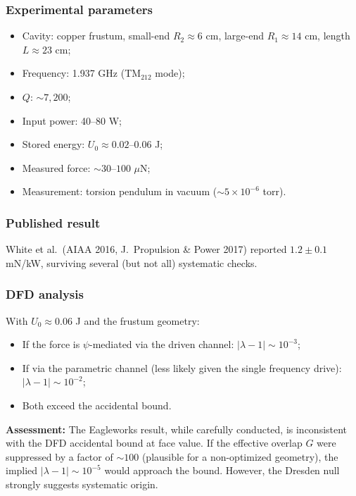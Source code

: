\documentclass[12pt,letterpaper]{article}
\begin{document}
\subsubsection{Experimental parameters}
\begin{itemize}[noitemsep]
  \item Cavity: copper frustum, small-end $R_2 \approx 6$ cm,
    large-end $R_1 \approx 14$ cm, length $L \approx 23$ cm;
  \item Frequency: 1.937 GHz (TM$_{212}$ mode);
  \item $Q$: $\sim 7{,}200$;
  \item Input power: 40--80 W;
  \item Stored energy: $U_0 \approx 0.02$--$0.06$ J;
  \item Measured force: $\sim 30$--$100$ $\mu$N;
  \item Measurement: torsion pendulum in vacuum ($\sim 5\times 10^{-6}$ torr).
\end{itemize}

\subsubsection{Published result}

White et al.\ (AIAA 2016, J.\ Propulsion \& Power 2017) reported
$1.2 \pm 0.1$ mN/kW, surviving several (but not all) systematic checks.

\subsubsection{DFD analysis}

With $U_0 \approx 0.06$ J and the frustum geometry:
\begin{itemize}[noitemsep]
  \item If the force is $\psi$-mediated via the driven channel:
    $|\lambda - 1| \sim 10^{-3}$;
  \item If via the parametric channel (less likely given the single
    frequency drive): $|\lambda - 1| \sim 10^{-2}$;
  \item Both exceed the accidental bound.
\end{itemize}

\textbf{Assessment:} The Eagleworks result, while carefully conducted,
is inconsistent with the DFD accidental bound at face value.  If the
effective overlap $G$ were suppressed by a factor of $\sim 100$
(plausible for a non-optimized geometry), the implied
$|\lambda - 1| \sim 10^{-5}$ would approach the bound.  However, the
Dresden null strongly suggests systematic origin.
\end{document}
